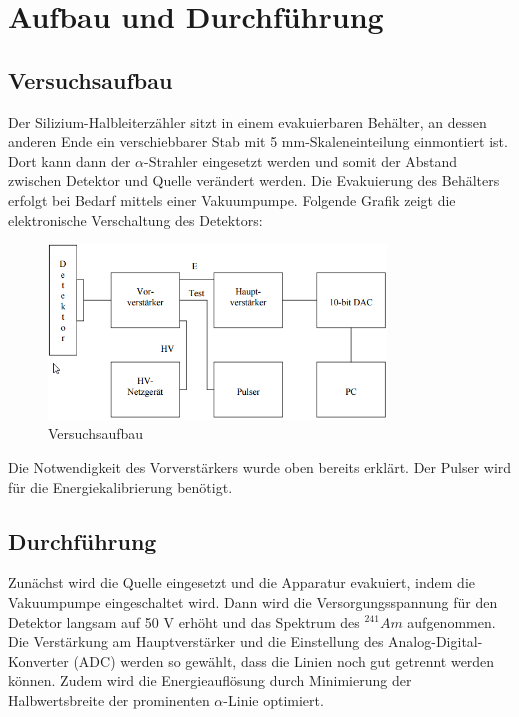 \documentclass[bigchapter,colorback,accentcolor=tud4b,linedtoc,11pt]{tudreport}
\begin{document}
\chapter{Aufbau und Durchführung}

\section{Versuchsaufbau}

Der Silizium-Halbleiterzähler sitzt in einem evakuierbaren Behälter, an dessen anderen Ende ein verschiebbarer Stab mit 5 mm-Skaleneinteilung einmontiert ist. Dort kann dann der $\alpha$-Strahler eingesetzt werden und somit der Abstand zwischen Detektor und Quelle verändert werden. Die Evakuierung des Behälters erfolgt bei Bedarf mittels einer Vakuumpumpe. Folgende Grafik zeigt die elektronische Verschaltung des Detektors: 

\begin{figure}[h] 
  \centering
     \includegraphics[width=0.8\textwidth]{img/Aufbau.png}
  \caption{Versuchsaufbau \cite{anleitung}}
  \label{fig:Bild1}
\end{figure}

Die Notwendigkeit des Vorverstärkers wurde oben bereits erklärt. Der Pulser wird für die Energiekalibrierung benötigt. 

\section{Durchführung}

Zunächst wird die Quelle eingesetzt und die Apparatur evakuiert, indem die Vakuumpumpe eingeschaltet wird. Dann wird die Versorgungsspannung für den Detektor langsam auf 50 V erhöht und das Spektrum des $^{241}Am$ aufgenommen. Die Verstärkung am Hauptverstärker und die Einstellung des Analog-Digital-Konverter (ADC) werden so gewählt, dass die Linien noch gut getrennt werden können. Zudem wird die Energieauflösung durch Minimierung der Halbwertsbreite der prominenten $\alpha$-Linie optimiert. 
\end{document}
